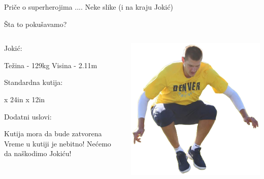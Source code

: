 \documentclass{beamer}
\begin{document}
    \begin{frame}{Priče o superherojima}
        .... Neke slike (i na kraju Jokić)
    \end{frame}
    \begin{frame}{Šta to pokušavamo?}
        \begin{columns}
        \begin{column}{0.5\textwidth}
            Jokić: \begin{itemize}
                \itemR Težina - 129kg
                \itemR Visina - 2.11m
            \end{itemize}
            Standardna kutija: \begin{itemize}
                \itemR 24in x 24in x 12in
            \end{itemize}
            Dodatni uslovi: \begin{itemize}
                \itemR Kutija mora da bude zatvorena
                \itemR Vreme u kutiji je nebitno!
                \itemR Nećemo da naškodimo Jokiću!
            \end{itemize}
        \end{column}
        \begin{column}{0.5\textwidth}
            \includegraphics[height=0.4\textheight]{Res/Jokic/Jokic_skok} \\

\end{column}
\end{columns}
\end{frame}
\end{document}
